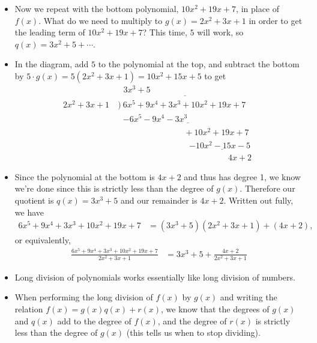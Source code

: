 \documentclass{ximera}
\begin{document}
\begin{example}
\begin{explanation}
\begin{itemize}
    \item Now we repeat with the bottom polynomial, $10x^2+19x+7$, in place of $f(x)$. What do we need to multiply to $g(x) = 2x^2+3x+1$ in order to get the leading term of $10x^2+19x+7$? This time, $5$ will work, so $q(x) = 3x^2+5+\cdots$.
    
    \item In the diagram, add $5$ to the polynomial at the top, and subtract the bottom by $5 \cdot g(x) = 5(2x^2+3x+1) = 10x^2+15x+5$ to get
    \begin{align*}
   & \underline{~~~3x^3+5\phantom{somethingssomethingssom}} \\[-4pt]  2x^2+3x+1~&\Big)~6x^5+9x^4+3x^3+10x^2+19x+7 \\[-4pt] &\phantom{\big)~} \underline{-6x^5-9x^4-3x^3\phantom{............................}} \\[-4pt] &\phantom{\Big)~}\phantom{..........................}+10x^2+19x+7 \\[-4pt] &\phantom{\big).............................}\underline{-10x^2-15x-5\phantom{..}} \\[-3pt] &\phantom{...............................................}4x+2
\end{align*}
    
  \item Since the polynomial at the bottom is $4x+2$ and thus has degree 1, we know we're done since this is strictly less than the degree of $g(x)$. Therefore our quotient is $q(x) = 3x^3+5$ and our remainder is $4x + 2$. Written out fully, we have
  \begin{align*}
    6x^5+9x^4+3x^3+10x^2+19x+7 &= (3x^3+5)(2x^2+3x+1) + (4x+2),
  \end{align*}
  or equivalently,
  \begin{align*}
    \frac{6x^5+9x^4+3x^3+10x^2+19x+7}{2x^2+3x+1} &= 3x^3+5 + \frac{4x+2}{2x^2+3x+1}
  \end{align*}
    \end{itemize}
  \end{explanation}
\end{example}


\begin{summary}\begin{itemize}
\item Long division of polynomials works essentially like long division of numbers. 
\item When performing the long division of $f(x)$ by $g(x)$ and writing the relation $f(x) = g(x)q(x)+r(x)$, we know that the degrees of $g(x)$ and $q(x)$ add to the degree of $f(x)$, and the degree of $r(x)$ is strictly less than the degree of $g(x)$ (this tells us when to stop dividing).
\end{itemize}\end{summary}
\end{document}

